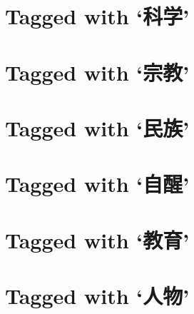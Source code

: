 \section*{Tagged with `\textbf{科学}'}

\section*{Tagged with `\textbf{宗教}'}

\section*{Tagged with `\textbf{民族}'}

\section*{Tagged with `\textbf{自醒}'}

\section*{Tagged with `\textbf{教育}'}

\section*{Tagged with `\textbf{人物}'}

